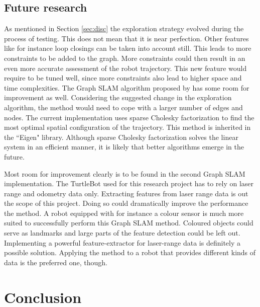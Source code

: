\documentclass{ba-kecs}
\begin{document}
\subsection{Future research}
As mentioned in Section \ref{sec:disc} the exploration strategy evolved during the process of testing. This does not mean that it is near perfection. Other features like for instance loop closings can be taken into account still. This leads to more constraints to be added to the graph. More constraints could then result in an even more accurate assessment of the robot trajectory. This new feature would require to be tuned well, since more constraints also lead to higher space and time complexities. 
The Graph SLAM algorithm proposed by \citep{Grisetti} has some room for improvement as well. Considering the suggested change in the exploration algorithm, the method would need to cope with a larger number of edges and nodes.
The current implementation uses sparse Cholesky factorization to find the most optimal spatial configuration of the trajectory. This method is inherited in the ``Eigen" library. Although sparse Cholesky factorization solves the linear system in an efficient manner, it is likely that better algorithms emerge in the future.

Most room for improvement clearly is to be found in the second Graph SLAM implementation. The TurtleBot used for this research project has to rely on laser range and odometry data only. Extracting features from laser range data is out the scope of this project. Doing so could dramatically improve the performance the method. 
A robot equipped with for instance a colour sensor is much more suited to successfully perform this Graph SLAM method. Coloured objects could serve as landmarks and large parts of the feature detection could be left out. Implementing a powerful feature-extractor for laser-range data is definitely a possible solution. Applying the method to a robot that provides different kinds of data is the preferred one, though.

\section{Conclusion}
\label{sec:conc}

\nocite{*}
\onecolumn
\appendix
\end{document}
